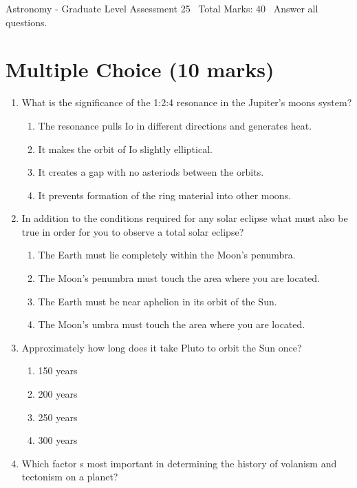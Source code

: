 \documentclass[12pt]{article}
\begin{document}
\begin{center}
Astronomy - Graduate Level Assessment 25 \
Total Marks: 40 \
Answer all questions.
\end{center}

\section*{Multiple Choice (10 marks)}
\begin{enumerate}[label=\arabic*.]
\item What is the significance of the 1:2:4 resonance in the Jupiter's moons system?
\begin{enumerate}[label=(\alph*)]
    \item The resonance pulls Io in different directions and generates heat.
    \item It makes the orbit of Io slightly elliptical.
    \item It creates a gap with no asteriods between the orbits.
    \item It prevents formation of the ring material into other moons.
\end{enumerate}
\item In addition to the conditions required for any solar eclipse what must also be true in order for you to observe a total solar eclipse?
\begin{enumerate}[label=(\alph*)]
    \item The Earth must lie completely within the Moon's penumbra.
    \item The Moon's penumbra must touch the area where you are located.
    \item The Earth must be near aphelion in its orbit of the Sun.
    \item The Moon's umbra must touch the area where you are located.
\end{enumerate}
\item Approximately how long does it take Pluto to orbit the Sun once?
\begin{enumerate}[label=(\alph*)]
    \item 150 years
    \item 200 years
    \item 250 years
    \item 300 years
\end{enumerate}
\item Which factor s most important in determining the history of volanism and tectonism on a planet?
\begin{enumerate}[label=(\alph*)]

\end{enumerate}
\end{enumerate}
\end{document}
